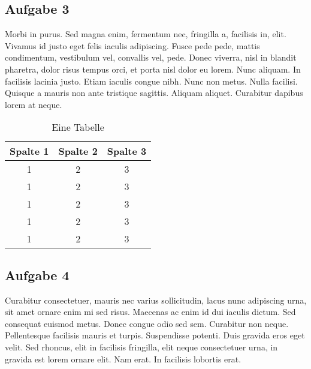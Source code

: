 \documentclass{scrartcl}
\begin{document}

\subsection*{Aufgabe 3}
Morbi in purus. Sed magna enim, fermentum nec, fringilla a, facilisis in, elit. Vivamus id justo eget felis iaculis adipiscing. Fusce pede pede, mattis condimentum, vestibulum vel, convallis vel, pede. Donec viverra, nisl in blandit pharetra, dolor risus tempus orci, et porta nisl dolor eu lorem. Nunc aliquam. In facilisis lacinia justo. Etiam iaculis congue nibh. Nunc non metus. Nulla facilisi. Quisque a mauris non ante tristique sagittis. Aliquam aliquet. Curabitur dapibus lorem at neque.

\begin{table}[h]
\centering
\begin{tabular}{c|cc}
Spalte 1 & Spalte 2 & Spalte 3 \\
\hline
1 & 2 & 3 \\
1 & 2 & 3 \\
1 & 2 & 3 \\
1 & 2 & 3 \\
1 & 2 & 3 \\
\end{tabular}
\caption{Eine Tabelle}
\end{table}

\subsection*{Aufgabe 4}
Curabitur consectetuer, mauris nec varius sollicitudin, lacus nunc adipiscing urna, sit amet ornare enim mi sed risus. Maecenas ac enim id dui iaculis dictum. Sed consequat euismod metus. Donec congue odio sed sem. Curabitur non neque. Pellentesque facilisis mauris et turpis. Suspendisse potenti. Duis gravida eros eget velit. Sed rhoncus, elit in facilisis fringilla, elit neque consectetuer urna, in gravida est lorem ornare elit. Nam erat. In facilisis lobortis erat.
\end{document}
